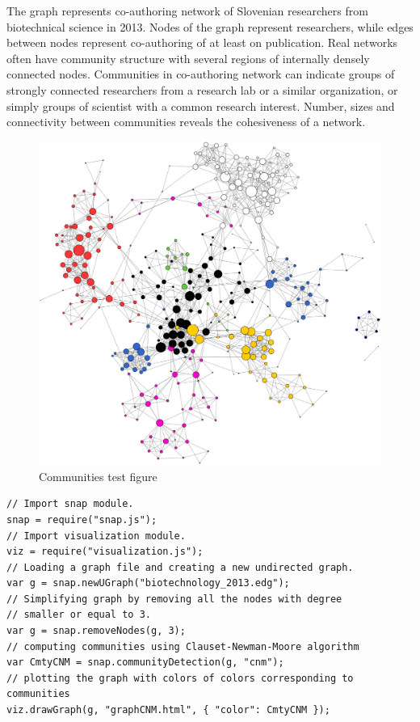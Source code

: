 \documentclass{article} %
\begin{document}
The graph represents co-authoring network of Slovenian researchers from biotechnical science in 2013. Nodes of the graph represent researchers, while edges between nodes represent co-authoring of at least on publication. Real networks often have community structure with several regions of internally densely connected nodes. Communities in co-authoring network can indicate groups of strongly connected researchers from a research lab or a similar organization, or simply groups of scientist with a common research interest. Number, sizes and connectivity between communities reveals the cohesiveness of a network.

\begin{figure}[h]
\begin{center}
\includegraphics[scale=0.25]{communitiestest.jpg} 
\caption{Communities test figure}
\end{center}
\end{figure}

\begin{lstlisting}[caption=Graph analysis] 
// Import snap module.
snap = require("snap.js");
// Import visualization module.
viz = require("visualization.js");
// Loading a graph file and creating a new undirected graph.
var g = snap.newUGraph("biotechnology_2013.edg");
// Simplifying graph by removing all the nodes with degree 
// smaller or equal to 3.
var g = snap.removeNodes(g, 3);
// computing communities using Clauset-Newman-Moore algorithm
var CmtyCNM = snap.communityDetection(g, "cnm");
// plotting the graph with colors of colors corresponding to communities
viz.drawGraph(g, "graphCNM.html", { "color": CmtyCNM });
\end{lstlisting}
\end{document}
